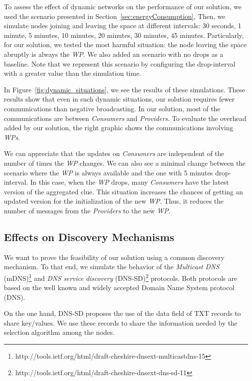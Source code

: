 To assess the effect of  dynamic networks on the performance of our solution, we used the scenario presented in Section~\ref{sec:energyConsumption},
Then, we simulate nodes joining and leaving the space at different intervals: 30 seconds, 1 minute, 5 minutes, 10 minutes, 20 minutes, 30 minutes, 45 minutes.
Particularly, for our solution, we tested the most harmful situation: the node leaving the space abruptly is always the \emph{WP}.
We also added an scenario with no drops as a baseline.
Note that we represent this scenario by configuring the drop-interval with a greater value than the simulation time.

In Figure~\ref{fig:dynamic_situations}, we see the results of these simulations.
These results show that even in such dynamic situations, our solution requires fewer communications than negative broadcasting.
In our solution, most of the communications are between \emph{Consumers} and \emph{Providers}.
To evaluate the overhead added by our solution, the right graphic shows the communications involving \emph{WPs}.

We can appreciate that the updates on \emph{Consumers} are independent of the number of times the \emph{WP} changes.
We can also see a minimal change between the scenario where the \emph{WP} is always available and the one with 5 minutes drop-interval.
In this case, when the \emph{WP} drops, many \emph{Consumers} have the latest version of the aggregated clue.
This situation increases the chances of getting an updated version for the initialization of the new \emph{WP}.
Thus, it reduces the number of messages from the \emph{Providers} to the new \emph{WP}.


\subsection{Effects on Discovery Mechanisms}
\label{sec:mdns}
We want to prove the feasibility of our solution using a common discovery mechanism.
To that end, we simulate the behavior of the \emph{Multicast DNS} (mDNS)\footnote{http://tools.ietf.org/html/draft-cheshire-dnsext-multicastdns-15}
and \emph{DNS service discovery} (DNS-SD)\footnote{http://tools.ietf.org/html/draft-cheshire-dnsext-dns-sd-11} protocols.
Both protocols are based on the well known and widely accepted Domain Name System protocol (DNS).

On the one hand, DNS-SD proposes the use of the data field of TXT records to share key/values.
We use these records to share the information needed by the selection algorithm among the nodes.

